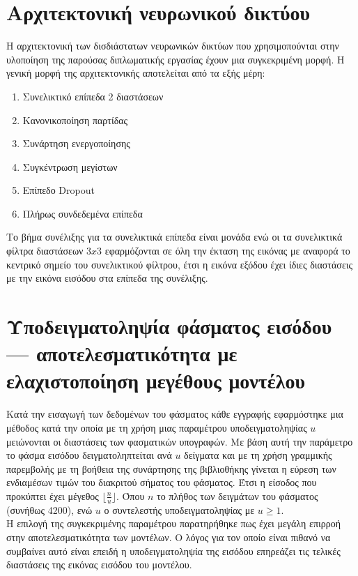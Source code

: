 \section{Αρχιτεκτονική νευρωνικού δικτύου}
Η αρχιτεκτονική των δισδιάστατων νευρωνικών δικτύων που χρησιμοπούνται στην υλοποίηση της παρούσας διπλωματικής εργασίας έχουν μια συγκεκριμένη μορφή. Η γενική μορφή της αρχιτεκτονικής αποτελείται από τα εξής μέρη:
\begin{enumerate}
    \item Συνελικτικό επίπεδα 2 διαστάσεων
    \item Κανονικοποίηση παρτίδας
    \item Συνάρτηση ενεργοποίησης
    \item Συγκέντρωση μεγίστων
    \item Επίπεδο Dropout
    \item Πλήρως συνδεδεμένα επίπεδα
\end{enumerate}
Το βήμα συνέλιξης για τα συνελικτικά επίπεδα είναι μονάδα ενώ οι τα συνελικτικά φίλτρα διαστάσεων $3x3$ εφαρμόζονται σε όλη την έκταση της εικόνας με αναφορά το κεντρικό σημείο του συνελικτικού φίλτρου, έτσι η εικόνα εξόδου έχει ίδιες διαστάσεις με την εικόνα εισόδου στα επίπεδα της συνέλιξης.

\section{Υποδειγματοληψία φάσματος εισόδου --- αποτελεσματικότητα με ελαχιστοποίηση μεγέθους μοντέλου}
Κατά την εισαγωγή των δεδομένων του φάσματος κάθε εγγραφής εφαρμόστηκε μια μέθοδος κατά την οποία με τη χρήση μιας παραμέτρου υποδειγματοληψίας  $u$ μειώνονται οι διαστάσεις των φασματικών υπογραφών. Με βάση αυτή την παράμετρο το φάσμα εισόδου δειγματοληπτείται ανά $u$ δείγματα και με τη χρήση γραμμικής παρεμβολής με τη βοήθεια της συνάρτησης  της βιβλιοθήκης  γίνεται η εύρεση των ενδιαμέσων τιμών του διακριτού σήματος του φάσματος. Έτσι η είσοδος που προκύπτει έχει μέγεθος $\lfloor\frac{n}{u}\rfloor$. Όπου $n$ το πλήθος των δειγμάτων του φάσματος (συνήθως 4200), ενώ $u$ ο συντελεστής υποδειγματοληψίας με $u\ge1$.\\
Η επιλογή της συγκεκριμένης παραμέτρου παρατηρήθηκε πως έχει μεγάλη επιρροή στην αποτελεσματικότητα των μοντέλων. Ο λόγος για τον οποίο είναι πιθανό να συμβαίνει αυτό είναι επειδή η υποδειγματοληψία της εισόδου επηρεάζει τις τελικές διαστάσεις της εικόνας εισόδου του μοντέλου.

